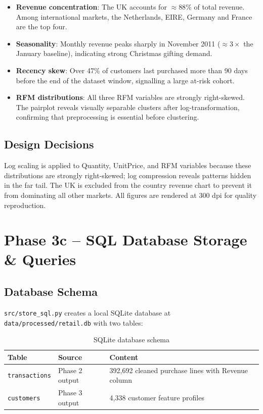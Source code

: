 \documentclass[12pt,a4paper]{report}
\begin{document}
\begin{itemize}[leftmargin=1.8em]
  \item \textbf{Revenue concentration}: The UK accounts for $\approx 88\%$ of total revenue. Among international markets, the Netherlands, EIRE, Germany and France are the top four.
  \item \textbf{Seasonality}: Monthly revenue peaks sharply in November 2011 ($\approx 3\times$ the January baseline), indicating strong Christmas gifting demand.
  \item \textbf{Recency skew}: Over 47\% of customers last purchased more than 90 days before the end of the dataset window, signalling a large at-risk cohort.
  \item \textbf{RFM distributions}: All three RFM variables are strongly right-skewed. The pairplot reveals visually separable clusters after log-transformation, confirming that preprocessing is essential before clustering.
\end{itemize}

\section{Design Decisions}

Log scaling is applied to Quantity, UnitPrice, and RFM variables because these distributions are strongly right-skewed; log compression reveals patterns hidden in the far tail. The UK is excluded from the country revenue chart to prevent it from dominating all other markets. All figures are rendered at 300 dpi for quality reproduction.

\chapter{Phase 3c -- SQL Database Storage \& Queries}

\section{Database Schema}

\texttt{src/store\_sql.py} creates a local SQLite database at \texttt{data/processed/retail.db} with two tables:

\begin{table}[H]
\centering
\caption{SQLite database schema}
\begin{tabularx}{\textwidth}{llX}
\toprule
\textbf{Table} & \textbf{Source} & \textbf{Content} \\
\midrule
\texttt{transactions} & Phase 2 output & 392,692 cleaned purchase lines with Revenue column \\
\texttt{customers} & Phase 3 output & 4,338 customer feature profiles \\
\bottomrule
\end{tabularx}
\end{table}
\end{document}

